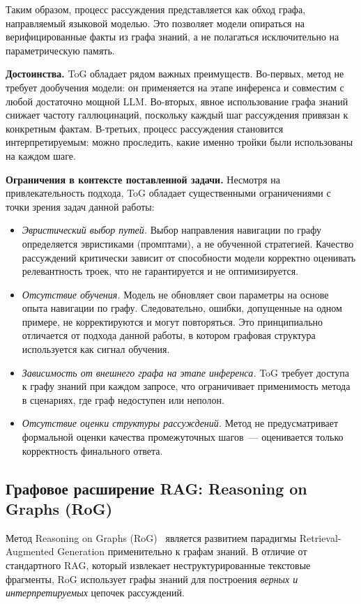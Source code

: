 Таким образом, процесс рассуждения представляется как обход графа, направляемый языковой моделью. Это позволяет модели опираться на верифицированные факты из графа знаний, а не полагаться исключительно на параметрическую память.

\textbf{Достоинства.}
ToG обладает рядом важных преимуществ. Во-первых, метод не требует дообучения модели: он применяется на этапе инференса и совместим с любой достаточно мощной LLM. Во-вторых, явное использование графа знаний снижает частоту галлюцинаций, поскольку каждый шаг рассуждения привязан к конкретным фактам. В-третьих, процесс рассуждения становится интерпретируемым: можно проследить, какие именно тройки были использованы на каждом шаге.

\textbf{Ограничения в контексте поставленной задачи.}
Несмотря на привлекательность подхода, ToG обладает существенными ограничениями с точки зрения задач данной работы:
\begin{itemize}
    \item \textit{Эвристический выбор путей.} Выбор направления навигации по графу определяется эвристиками (промптами), а не обученной стратегией. Качество рассуждений критически зависит от способности модели корректно оценивать релевантность троек, что не гарантируется и не оптимизируется.
    \item \textit{Отсутствие обучения.} Модель не обновляет свои параметры на основе опыта навигации по графу. Следовательно, ошибки, допущенные на одном примере, не корректируются и могут повторяться. Это принципиально отличается от подхода данной работы, в котором графовая структура используется как сигнал обучения.
    \item \textit{Зависимость от внешнего графа на этапе инференса.} ToG требует доступа к графу знаний при каждом запросе, что ограничивает применимость метода в сценариях, где граф недоступен или неполон.
    \item \textit{Отсутствие оценки структуры рассуждений.} Метод не предусматривает формальной оценки качества промежуточных шагов~--- оценивается только корректность финального ответа.
\end{itemize}

\subsection{Графовое расширение RAG: Reasoning on Graphs (RoG)}
\label{subsec:rog}

Метод Reasoning on Graphs (RoG)~\cite{luo2024rog} является развитием парадигмы Retrieval-Augmented Generation применительно к графам знаний. В отличие от стандартного RAG, который извлекает неструктурированные текстовые фрагменты, RoG использует графы знаний для построения \textit{верных и интерпретируемых} цепочек рассуждений.


